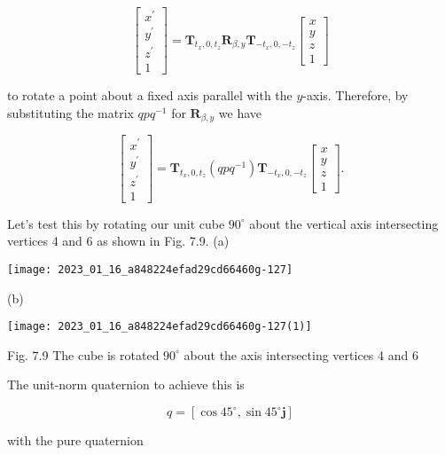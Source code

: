 $$
\left[\begin{array}{c}
x^{\prime} \\
y^{\prime} \\
z^{\prime} \\
1
\end{array}\right]=\mathbf{T}_{t_{x}, 0, t_{z}} \mathbf{R}_{\beta, y} \mathbf{T}_{-t_{x}, 0,-t_{z}}\left[\begin{array}{c}
x \\
y \\
z \\
1
\end{array}\right]
$$

to rotate a point about a fixed axis parallel with the $y$-axis. Therefore, by substituting the matrix $q p q^{-1}$ for $\mathbf{R}_{\beta, y}$ we have

$$
\left[\begin{array}{c}
x^{\prime} \\
y^{\prime} \\
z^{\prime} \\
1
\end{array}\right]=\mathbf{T}_{t_{x}, 0, t_{z}}\left(q p q^{-1}\right) \mathbf{T}_{-t_{x}, 0,-t_{z}}\left[\begin{array}{c}
x \\
y \\
z \\
1
\end{array}\right] .
$$

Let's test this by rotating our unit cube $90^{\circ}$ about the vertical axis intersecting vertices 4 and 6 as shown in Fig. 7.9. (a)

\begin{center}
\texttt{[image: 2023\_01\_16\_a848224efad29cd66460g-127]}
\end{center}

(b)

\begin{center}
\texttt{[image: 2023\_01\_16\_a848224efad29cd66460g-127(1)]}
\end{center}

Fig. 7.9 The cube is rotated $90^{\circ}$ about the axis intersecting vertices 4 and 6

The unit-norm quaternion to achieve this is

$$
q=\left[\cos 45^{\circ}, \sin 45^{\circ} \mathbf{j}\right]
$$

with the pure quaternion

